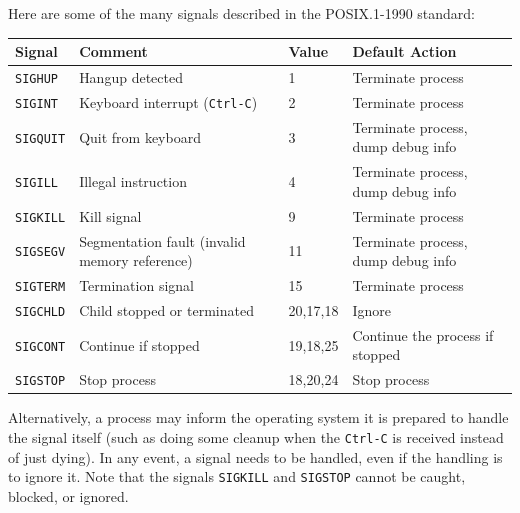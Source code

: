 \documentclass[a4paper]{report}
\begin{document}
Here are some of the many signals described in the POSIX.1-1990 standard:

\begin{center}
	\begin{tabular}{l|l|l|l}
		\textbf{Signal}  & \textbf{Comment}                              & \textbf{Value} & \textbf{Default Action}            \\ \hline
		\texttt{SIGHUP}  & Hangup detected                               & 1              & Terminate process                  \\
		\texttt{SIGINT}  & Keyboard interrupt (\texttt{Ctrl-C})          & 2              & Terminate process                  \\
		\texttt{SIGQUIT} & Quit from keyboard                            & 3              & Terminate process, dump debug info \\
		\texttt{SIGILL}  & Illegal instruction                           & 4              & Terminate process, dump debug info \\
		\texttt{SIGKILL} & Kill signal                                   & 9              & Terminate process                  \\
		\texttt{SIGSEGV} & Segmentation fault (invalid memory reference) & 11             & Terminate process, dump debug info \\
		\texttt{SIGTERM} & Termination signal                            & 15             & Terminate process                  \\
		\texttt{SIGCHLD} & Child stopped or terminated                   & 20,17,18       & Ignore                             \\
		\texttt{SIGCONT} & Continue if stopped                           & 19,18,25       & Continue the process if stopped    \\
		\texttt{SIGSTOP} & Stop process                                  & 18,20,24       & Stop process                       \\
	\end{tabular}
\end{center}


Alternatively, a process may inform the operating system it is prepared to handle the signal itself (such as doing some cleanup when the \texttt{Ctrl-C} is received instead of just dying). In any event, a signal needs to be handled, even if the handling is to ignore it. Note that the signals \texttt{SIGKILL} and \texttt{SIGSTOP} cannot be caught, blocked, or ignored.
\end{document}
